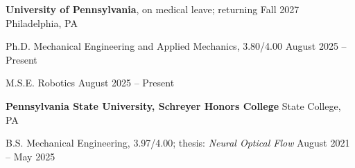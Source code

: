 \textbf{University of Pennsylvania}, on medical leave; returning Fall 2027 \hfill Philadelphia, PA

Ph.D. Mechanical Engineering and Applied Mechanics, 3.80/4.00 \hfill August 2025 -- Present

M.S.E. Robotics \hfill August 2025 -- Present

\textbf{Pennsylvania State University, Schreyer Honors College} \hfill State College, PA

B.S. Mechanical Engineering, 3.97/4.00; thesis: \textit{Neural Optical Flow} \hfill August 2021 -- May 2025
